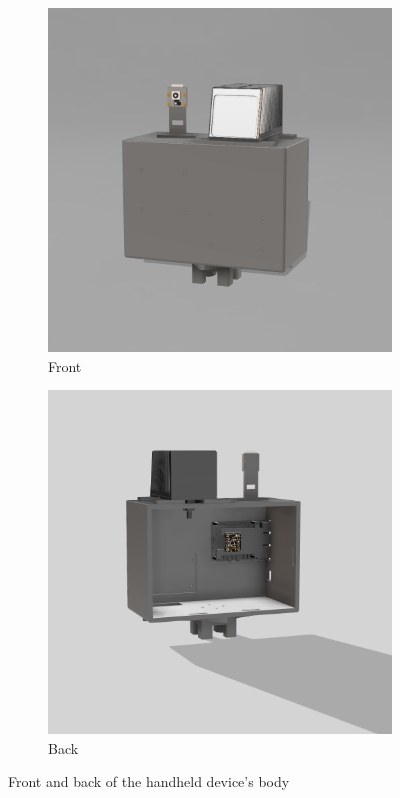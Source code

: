\documentclass[english, bachelor, utf8]{base/thesis_telematics}
\begin{document}
\begin{figure}[htbp]
    \centering
    \begin{subfigure}[b]{0.4\textwidth}
        \centering
        \includegraphics[width=\textwidth]{pics/Device Images/device_front_transparent.png}
        \caption{Front}
        \label{fig:bild1}
    \end{subfigure}
    \hfill
    \begin{subfigure}[b]{0.4\textwidth}
        \centering
        \includegraphics[width=\textwidth]{pics/Device Images/device_back.png}
        \caption{Back}
        \label{fig:bild2}
    \end{subfigure}
    \caption{Front and back of the handheld device's body}
    \label{fig:drei_bilder}
\end{figure}
\end{document}
